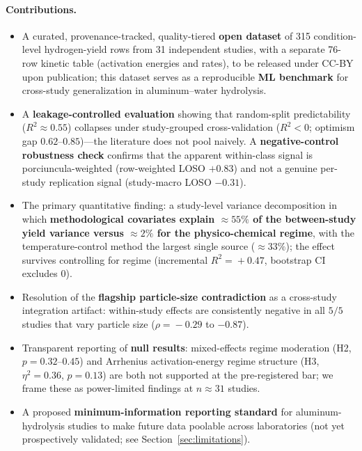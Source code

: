 \paragraph{Contributions.}
\begin{itemize}\itemsep2pt
  \item A curated, provenance-tracked, quality-tiered \textbf{open dataset} of 315
  condition-level hydrogen-yield rows from 31 independent studies, with a separate
  76-row kinetic table (activation energies and rates), to be released under CC-BY upon publication; this
  dataset serves as a reproducible \textbf{ML benchmark} for cross-study generalization
  in aluminum--water hydrolysis.
  \item A \textbf{leakage-controlled evaluation} showing that random-split predictability
  ($R^2\!\approx\!0.55$) collapses under study-grouped cross-validation ($R^2<0$; optimism
  gap $0.62$--$0.85$)---the literature does not pool naively. A \textbf{negative-control
  robustness check} confirms that the apparent within-class signal is porciuncula-weighted
  (row-weighted LOSO $+0.83$) and not a genuine per-study replication signal (study-macro
  LOSO $-0.31$).
  \item The primary quantitative finding: a study-level variance decomposition in which
  \textbf{methodological covariates explain $\approx\!55\%$ of the between-study yield
  variance versus $\approx\!2\%$ for the physico-chemical regime}, with the
  temperature-control method the largest single source ($\approx\!33\%$); the effect
  survives controlling for regime (incremental $R^2\!=\!+0.47$, bootstrap CI excludes 0).
  \item Resolution of the \textbf{flagship particle-size contradiction} as a cross-study
  integration artifact: within-study effects are consistently negative in all $5/5$
  studies that vary particle size ($\rho\!=\!-0.29$ to $-0.87$).
  \item Transparent reporting of \textbf{null results}: mixed-effects regime moderation
  (H2, $p\!=\!0.32$--$0.45$) and Arrhenius activation-energy regime structure (H3,
  $\eta^2\!=\!0.36$, $p\!=\!0.13$) are both not supported at the pre-registered bar;
  we frame these as power-limited findings at $n\!\approx\!31$ studies.
  \item A proposed \textbf{minimum-information reporting standard} for aluminum-hydrolysis
  studies to make future data poolable across laboratories (not yet prospectively
  validated; see Section~\ref{sec:limitations}).
\end{itemize}
